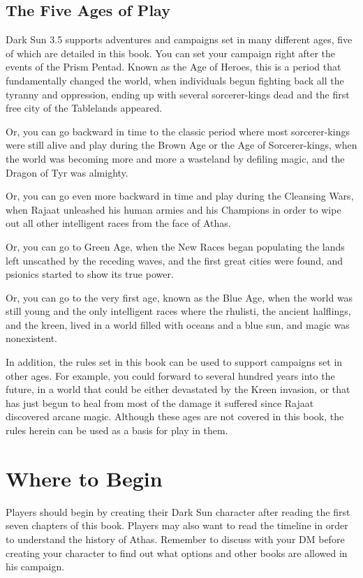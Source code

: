 \subsection{The Five Ages of Play}
{\tableheader Dark Sun} 3.5 supports adventures and campaigns set in many different ages, five of which are detailed in this book. You can set your campaign right after the events of the Prism Pentad. Known as the Age of Heroes, this is a period that fundamentally changed the world, when individuals begun fighting back all the tyranny and oppression, ending up with several sorcerer-kings dead and the first free city of the Tablelands appeared.

Or, you can go backward in time to the classic period where most sorcerer-kings were still alive and play during the Brown Age or the Age of Sorcerer-kings, when the world was becoming more and more a wasteland by defiling magic, and the Dragon of Tyr was almighty.

Or, you can go even more backward in time and play during the Cleansing Wars, when Rajaat unleashed his human armies and his Champions in order to wipe out all other intelligent races from the face of Athas.

Or, you can go to Green Age, when the New Races began populating the lands left unscathed by the receding waves, and the first great cities were found, and psionics started to show its true power.

Or, you can go to the very first age, known as the Blue Age, when the world was still young and the only intelligent races where the rhulisti, the ancient halflings, and the kreen, lived in a world filled with oceans and a blue sun, and magic was nonexistent.

In addition, the rules set in this book can be used to support campaigns set in other ages. For example, you could forward to several hundred years into the future, in a world that could be either devastated by the Kreen invasion, or that has just begun to heal from most of the damage it suffered since Rajaat discovered arcane magic. Although these ages are not covered in this book, the rules herein can be used as a basis for play in them.


\section{Where to Begin}
Players should begin by creating their {\tableheader Dark Sun} character after reading the first seven chapters of this book. Players may also want to read the timeline in order to understand the history of Athas. Remember to discuss with your DM before creating your character to find out what options and other books are allowed in his campaign.


